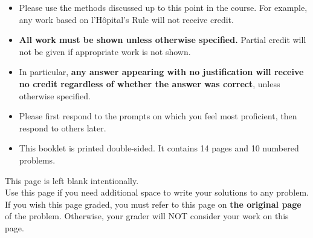 \documentclass[11pt]{article}
\begin{document}
{\begin{itemize}
    \item Please use the methods discussed up to this point in the course. For example, any work based on l'H\^opital's Rule will not receive credit.
    \item \textbf{All work must be shown unless otherwise specified.} Partial credit will not be given if appropriate work is not shown.
    \item In particular, {\bf any answer appearing with no justification will receive no credit regardless of whether the answer was correct}, unless otherwise specified.
    \item Please first respond to the prompts on which you feel most proficient, then respond to others later.
    \item This booklet is printed double-sided. It contains 14 pages and 10 numbered problems.
    \end{itemize}
    
    }

\vfill


\newpage

This page is left blank intentionally.\\

Use this page if you need additional space to write your solutions to any problem. \\

If you wish this page graded, you must refer to this page on \textbf{the original page} of the problem. Otherwise, your grader will NOT consider your work on this page.

\newpage%
\end{document}
